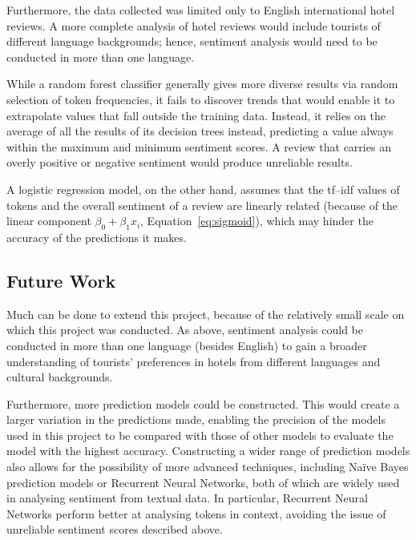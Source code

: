 \documentclass[12pt, a4paper]{pancake-article}
\begin{document}
Furthermore, the data collected was limited only to English international hotel reviews.
A more complete analysis of hotel reviews would include tourists of different language
backgrounds; hence, sentiment analysis would need to be conducted in more than one language.

While a random forest classifier generally gives more diverse results via random
selection of token frequencies, it fails to discover trends that would enable it to extrapolate
values that fall outside the training data. Instead, it relies on the average of all the results
of its decision trees instead, predicting a value always within the maximum and minimum sentiment scores.
A review that carries an overly positive or negative sentiment would produce unreliable results.

A logistic regression model, on the other hand, assumes that the tf--idf values of tokens
and the overall sentiment of a review are linearly related (because of the linear component $\beta_0 + \beta_1x_i$,
Equation~\ref{eq:sigmoid}), which may hinder the accuracy of the predictions it makes.

\subsection{Future Work}

Much can be done to extend this project, because of the relatively small scale on which this project
was conducted. As above, sentiment analysis could be conducted in more than one language (besides English)
to gain a broader understanding of tourists' preferences in hotels from different languages and cultural
backgrounds.

Furthermore, more prediction models could be constructed. This would create a larger
variation in the predictions made, enabling the precision of the models used in this project to be
compared with those of other models to evaluate the model with the highest accuracy. Constructing a
wider range of prediction models also allows for the possibility of more advanced techniques,
including Naïve Bayes prediction models or Recurrent Neural Networks, both of which are
widely used in analysing sentiment from textual data. In particular, Recurrent Neural
Networks perform better at analysing tokens in context, avoiding the issue
of unreliable sentiment scores described above.

\printbibliography[heading=bibintoc]
\end{document}
